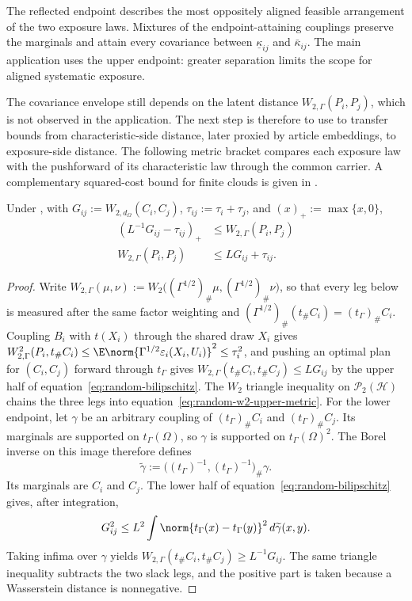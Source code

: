 The reflected endpoint describes the most oppositely aligned feasible
arrangement of the two exposure laws.
Mixtures of the endpoint-attaining couplings preserve the marginals and
attain every covariance between $\underline\kappa_{ij}$ and $\bar\kappa_{ij}$.
The main application uses the upper endpoint: greater separation limits the
scope for aligned systematic exposure.

The covariance envelope still depends on the latent distance
$W_{2,\Gamma}(P_i,P_j)$, which is not observed in the application.
The next step is therefore to use  to transfer
bounds from characteristic-side distance, later proxied by article
embeddings, to exposure-side distance.
The following metric bracket compares each exposure law with the
pushforward of its characteristic law through the common carrier.
A complementary squared-cost bound for finite clouds is given in
.

\begin{corollary}\label{cor:random-w2-metric}
  Under , with
  $G_{ij}:=W_{2,d_\Omega}(C_i,C_j)$, $\tau_{ij}:=\tau_i+\tau_j$, and
  $(x)_+:=\max\{x,0\}$,
  \begin{align}
    \left(L^{-1}G_{ij}-\tau_{ij}\right)_+
    &\le W_{2,\Gamma}(P_i,P_j)
    \label{eq:random-w2-lower-metric}\\
    W_{2,\Gamma}(P_i,P_j)
    &\le LG_{ij}+\tau_{ij}.
    \label{eq:random-w2-upper-metric}
  \end{align}
\end{corollary}

\begin{proof}
  Write $W_{2,\Gamma}(\mu,\nu):=W_2\bigl((\Gamma^{1/2})_\#\mu,
  (\Gamma^{1/2})_\#\nu\bigr)$, so that every leg below is measured after the
  same factor weighting and $(\Gamma^{1/2})_\#(t_\#C_i)=(t_\Gamma)_\#C_i$.
  Coupling $B_i$ with $t(X_i)$ through the shared draw $X_i$ gives
  $W_{2,\Gamma}^2(P_i,t_\#C_i)
  \le\E\norm{\Gamma^{1/2}\varepsilon_i(X_i,U_i)}^2\le\tau_i^2$, and pushing an
  optimal plan for $(C_i,C_j)$ forward through $t_\Gamma$ gives
  $W_{2,\Gamma}(t_\#C_i,t_\#C_j)\le LG_{ij}$ by the upper
  half of equation~\ref{eq:random-bilipschitz}. The $W_2$ triangle inequality
  on $\mathcal P_2(\mathcal H)$ chains the three legs into
  equation~\ref{eq:random-w2-upper-metric}.
  For the lower endpoint, let $\gamma$ be an arbitrary coupling of
  $(t_\Gamma)_\#C_i$ and $(t_\Gamma)_\#C_j$. Its marginals are supported on
  $t_\Gamma(\Omega)$, so $\gamma$ is supported on
  $t_\Gamma(\Omega)^2$. The Borel inverse on this image therefore defines
  \[
    \widetilde\gamma
    :=\bigl((t_\Gamma)^{-1},(t_\Gamma)^{-1}\bigr)_\#\gamma.
  \]
  Its marginals are $C_i$ and $C_j$. The lower half of
  equation~\ref{eq:random-bilipschitz} gives, after integration,
  \[
    G_{ij}^{2}
    \le L^{2}\int
    \norm{t_\Gamma(x)-t_\Gamma(y)}^{2}\,d\widetilde\gamma(x,y).
  \]
  Taking infima over $\gamma$ yields
  $W_{2,\Gamma}(t_\#C_i,t_\#C_j)\ge L^{-1}G_{ij}$. The same
  triangle inequality subtracts the two slack legs, and the positive part is
  taken because a Wasserstein distance is nonnegative.
\end{proof}

